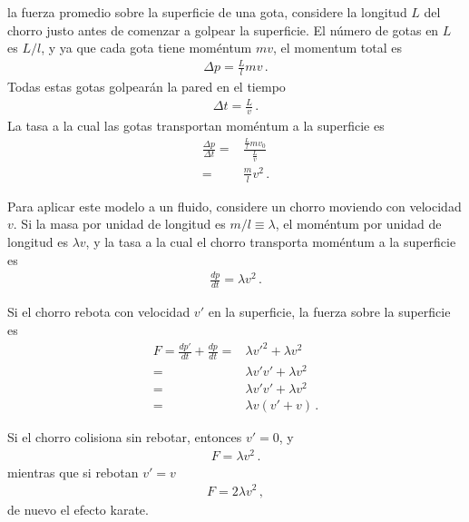 \begin{borrar}
la fuerza promedio sobre la superficie de una gota, considere la longitud $L$ del chorro justo antes de comenzar a golpear la superficie. El número de gotas en $L$ es $L/l$, y ya que cada gota tiene moméntum $m v$, el momentum total es
\begin{align*}
  \Delta p=\frac{L}{l}m v\,.
\end{align*}
Todas estas gotas golpearán la pared en el tiempo
\begin{align*}
  \Delta t=\frac{L}{v}\,.
\end{align*}
La tasa a la cual las gotas transportan moméntum a la superficie es
\begin{align*}
  \frac{\Delta p}{\Delta t}
  =&\frac{\displaystyle\frac{L}{l}m v_0}{\displaystyle\frac{L}{v}}\nonumber\\
  =&\frac{m}{l}v^2\,.
\end{align*}


Para aplicar este modelo a un fluido, considere un chorro moviendo con velocidad $v$. Si la masa por unidad de longitud es $m/l\equiv \lambda$, el moméntum por unidad de longitud es $\lambda v$, y la tasa a la cual el chorro transporta moméntum a la superficie es
\begin{align*}
  \frac{dp}{dt}=\lambda v^2\,.
\end{align*}

Si el chorro rebota con velocidad $v'$ en la superficie, la fuerza sobre la superficie es
\begin{align*}
  F=\frac{dp'}{dt}+\frac{dp}{dt}=&\lambda {v'}^2+\lambda v^2\nonumber\\
  =&\lambda v'v'+\lambda v^2\nonumber\\
  =&\lambda v'v'+\lambda v^2\nonumber\\
  =&\lambda v (v'+v)\,.
\end{align*}

Si el chorro colisiona sin rebotar, entonces $v'=0$, y
\begin{align*}
F=\lambda v^2\,.  
\end{align*}
mientras que si rebotan $v'=v$
\begin{align*}
  F=2\lambda v^2\,,
\end{align*}
de nuevo el efecto karate.
  
\end{borrar}





